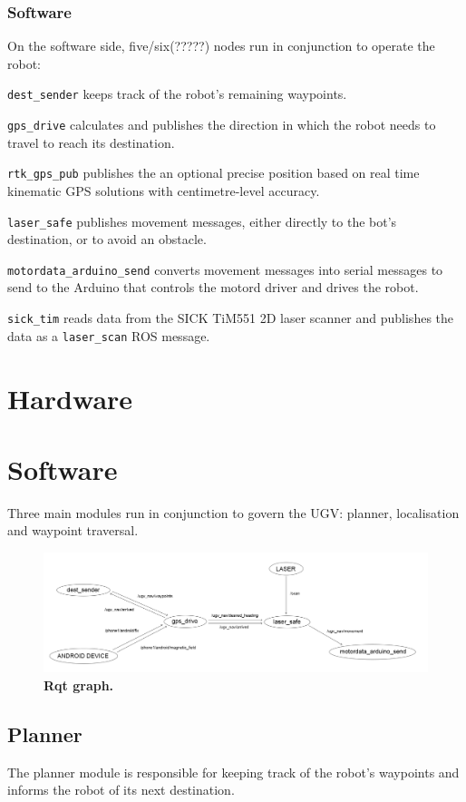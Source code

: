 \documentclass[titlepage,12pt,a4paper]{article}
\begin{document}
\subsubsection{Software}

On the software side, five/six(?????) nodes run in conjunction to operate the robot:

\verb|dest_sender| keeps track of the robot's remaining waypoints.

\verb|gps_drive| calculates and publishes the direction in which the robot needs to travel to reach its destination.

\verb|rtk_gps_pub| publishes the an optional precise position based on real time kinematic GPS solutions with centimetre-level accuracy.

\verb|laser_safe| publishes movement messages, either directly to the bot's destination, or to avoid an obstacle.

\verb|motordata_arduino_send| converts movement messages into serial messages to send to the Arduino that controls the motord driver and drives the robot.

\verb|sick_tim| reads data from the SICK TiM551 2D laser scanner and publishes the data as a \verb|laser_scan| ROS message.

\pagebreak
\section{Hardware}

\pagebreak
\section{Software}

Three main modules run in conjunction to govern the UGV: planner, localisation and waypoint traversal.

\begin{figure}[h]
	\centering
	\includegraphics[scale=0.255]{rqt.png}
	\caption{\textbf{Rqt graph.}}
\end{figure}

\subsection{Planner}
The planner module is responsible for keeping track of the robot's waypoints and informs the robot of its next destination. 
\end{document}
